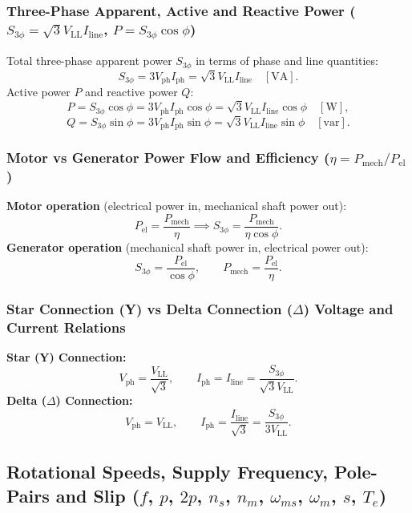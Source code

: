 \subsubsection{Three-Phase Apparent, Active and Reactive Power ($S_{3\phi} = \sqrt{3}V_{\mathrm{LL}}I_{\mathrm{line}}$, $P = S_{3\phi}\cos\phi$)}
Total three-phase apparent power $S_{3\phi}$ in terms of phase and line quantities:
\[
S_{3\phi} = 3 V_{\mathrm{ph}} I_{\mathrm{ph}} = \sqrt{3} V_{\mathrm{LL}} I_{\mathrm{line}}\quad[\mathrm{VA}].
\]
Active power $P$ and reactive power $Q$:
\[
P = S_{3\phi} \cos\phi = 3 V_{\mathrm{ph}} I_{\mathrm{ph}} \cos\phi = \sqrt{3} V_{\mathrm{LL}} I_{\mathrm{line}} \cos\phi\quad[\mathrm{W}],
\]
\[
Q = S_{3\phi} \sin\phi = 3 V_{\mathrm{ph}} I_{\mathrm{ph}} \sin\phi = \sqrt{3} V_{\mathrm{LL}} I_{\mathrm{line}} \sin\phi\quad[\mathrm{var}].
\]

\subsubsection{Motor vs Generator Power Flow and Efficiency ($\eta = P_{\mathrm{mech}} / P_{\mathrm{el}}$)}
\textbf{Motor operation} (electrical power in, mechanical shaft power out):
\[
P_{\mathrm{el}} = \frac{P_{\mathrm{mech}}}{\eta}
\implies
S_{3\phi} = \frac{P_{\mathrm{mech}}}{\eta \cos\phi}.
\]
\textbf{Generator operation} (mechanical shaft power in, electrical power out):
\[
S_{3\phi} = \frac{P_{\mathrm{el}}}{\cos\phi},
\qquad
P_{\mathrm{mech}} = \frac{P_{\mathrm{el}}}{\eta}.
\]

\subsubsection{Star Connection (Y) vs Delta Connection ($\Delta$) Voltage and Current Relations}
\textbf{Star (Y) Connection:}
\[
V_{\mathrm{ph}} = \frac{V_{\mathrm{LL}}}{\sqrt{3}},\qquad
I_{\mathrm{ph}} = I_{\mathrm{line}} = \frac{S_{3\phi}}{\sqrt{3} V_{\mathrm{LL}}}.
\]
\textbf{Delta ($\Delta$) Connection:}
\[
V_{\mathrm{ph}} = V_{\mathrm{LL}},\qquad
I_{\mathrm{ph}} = \frac{I_{\mathrm{line}}}{\sqrt{3}} = \frac{S_{3\phi}}{3 V_{\mathrm{LL}}}.
\]

\subsection{Rotational Speeds, Supply Frequency, Pole-Pairs and Slip ($f$, $p$, $2p$, $n_s$, $n_m$, $\omega_{ms}$, $\omega_m$, $s$, $T_e$)}

